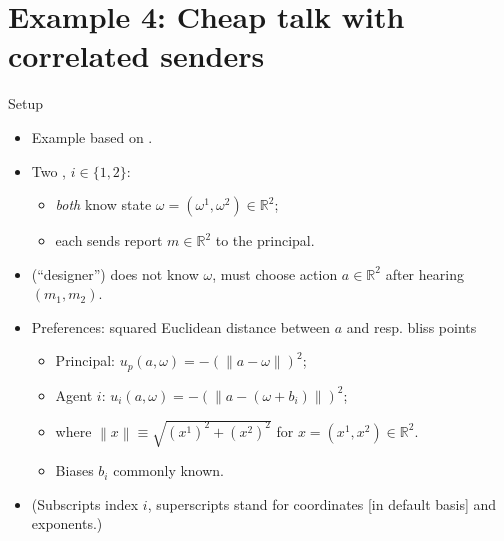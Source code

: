 \documentclass[english,10pt
,aspectratio=169
]{beamer}
\begin{document}
\section{Example 4: Cheap talk with correlated senders}

\begin{frame}{Setup}
	\begin{itemize}
		\item Example based on \cite{battaglini_multiple_2002}.
		\item Two , $i \in \{1,2\}$:
		\begin{itemize}
			\item \emph{both} know \alert{state} $\omega = (\omega^1,\omega^2) \in \mathbb{R}^2$;
			\item each sends \alert{report} $m \in \mathbb{R}^2$ to the principal.
		\end{itemize}
		\item {} (``designer'') does not know $\omega$, must choose action $a \in \mathbb{R}^2$ \alert{after} hearing $(m_1,m_2)$.
		\item Preferences: squared Euclidean distance between $a$ and resp. \alert{bliss points}
		\begin{itemize}
			\item Principal: $u_p (a,\omega) = -\left(\left\|a-\omega\right\| \right)^2$;
			\item Agent $i$: $u_i (a,\omega) = -\left(\left\|a-(\omega+b_i)\right\| \right)^2$;
			\item where $\left\|x\right\| \equiv \sqrt{(x^1)^2 + (x^2)^2}$ for $x = (x^1,x^2) \in \mathbb{R}^2$.
			\item \alert{Biases} $b_i$ commonly known.
		\end{itemize}
		\item (Subscripts index $i$, superscripts stand for coordinates [in default basis] and exponents.)
	\end{itemize}
\end{frame}
\end{document}
